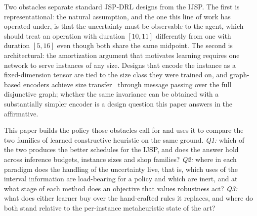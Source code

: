 \documentclass[preprint,authoryear,12pt]{elsarticle}
\theoremstyle{definition}
\theoremstyle{remark}
\begin{document}
Two obstacles separate standard JSP-DRL designs from the IJSP.
The first is representational: the natural assumption, and the one
this line of work has operated under, is that the uncertainty must be
observable to the agent, which should treat an operation with
duration $[10,11]$ differently from one with duration $[5,16]$ even
though both share the same midpoint. The second is
architectural: the amortization argument that motivates learning
requires one network to serve instances of any size. Designs that
encode the instance as a fixed-dimension tensor are tied to the size
class they were trained on, and graph-based encoders achieve size
transfer~\citep{Zhang2020L2D,Park2021GNN} through message passing
over the full disjunctive graph; whether the same invariance can be
obtained with a substantially simpler encoder is a design question
this paper answers in the affirmative.

This paper builds the policy those obstacles call for and uses it to
compare the two families of learned constructive heuristic on the same
ground. \emph{Q1:} which of the two produces the better schedules for
the IJSP, and does the answer hold across inference budgets, instance
sizes and shop families? \emph{Q2:} where in each paradigm does the
handling of the uncertainty live, that is, which uses of the interval
information are load-bearing for a policy and which are inert, and at
what stage of each method does an objective that values robustness
act? \emph{Q3:} what does either learner buy over the hand-crafted
rules it replaces, and where do both stand relative to the
per-instance metaheuristic state of the art?
\end{document}
